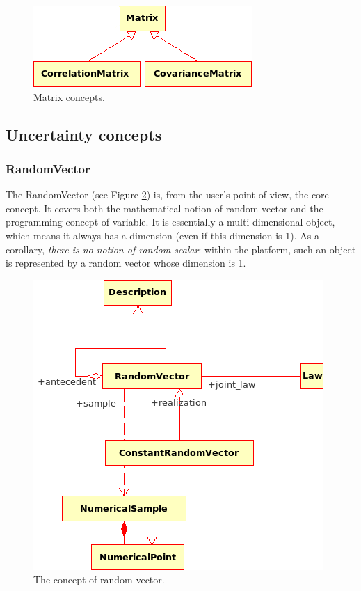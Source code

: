 \begin{figure}[htb]
  \begin{center}
    \includegraphics[scale=0.9]{Figures/analysis/matrix.png}
    \caption{Matrix concepts.}\label{fig:matrix}
  \end{center}
\end{figure}

\subsection{Uncertainty concepts}

\subsubsection{RandomVector}

The RandomVector (see Figure \ref{fig:random_vector}) is, from the user's point of view, the core concept. It covers both the mathematical notion of random vector and the programming concept of variable. It is essentially a multi-dimensional object, which means it always has a dimension (even if this dimension is 1). As a corollary, \emph{there is no notion of random scalar}: within the platform, such an object is represented by a random vector whose dimension is 1.

\begin{figure}[htb]
  \begin{center}
    \includegraphics[scale=0.9]{Figures/analysis/random_vector.png}
    \caption{The concept of random vector.}\label{fig:random_vector}
  \end{center}
\end{figure}

